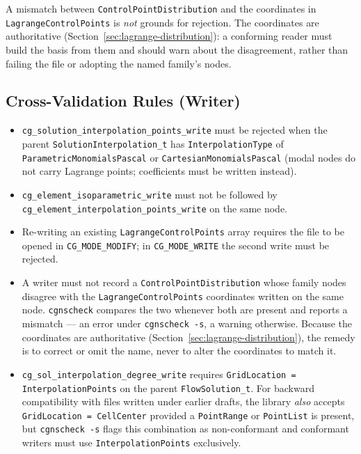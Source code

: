 \documentclass[11pt,letterpaper]{article}
\begin{document}
\noindent A mismatch between
\texttt{Control\-Point\-Distribution}\allowbreak{} and the coordinates in
\texttt{Lagrange\-Control\-Points} is \emph{not} grounds for rejection.  The coordinates are
authoritative (Section~\ref{sec:lagrange-distribution}): a conforming reader must build the
basis from them and should warn about the disagreement, rather than failing the file or
adopting the named family's nodes.

\subsection{Cross-Validation Rules (Writer)}

{\sloppy
\begin{itemize}
  \item \texttt{cg\_solution\_interpolation\_points\_write} must be rejected when the
    parent \texttt{SolutionInterpolation\_t} has \texttt{InterpolationType} of
    \texttt{ParametricMonomialsPascal} or \texttt{CartesianMonomialsPascal} (modal nodes do not
    carry Lagrange points; coefficients must be written instead).
  \item \texttt{cg\_element\_isoparametric\_write} must not be followed by
    \texttt{cg\_element\_interpolation\_points\_write} on the same node.
  \item Re-writing an existing \texttt{LagrangeControlPoints}
    array requires the file to be opened in \texttt{CG\_MODE\_MODIFY}; in
    \texttt{CG\_MODE\_WRITE} the second write must be rejected.
  \item A writer must not record a \texttt{ControlPointDistribution} whose family
    nodes disagree with the \texttt{LagrangeControlPoints} coordinates written on the same
    node.  \texttt{cgnscheck} compares the two whenever both are present and reports a
    mismatch --- an error under \texttt{cgnscheck -s}, a warning otherwise.  Because the
    coordinates are authoritative (Section~\ref{sec:lagrange-distribution}), the remedy is to
    correct or omit the name, never to alter the coordinates to match it.
  \item \texttt{cg\_sol\_interpolation\_degree\_write} requires
    \texttt{GridLocation = InterpolationPoints} on the parent \texttt{FlowSolution\_t}.
    For backward compatibility with files written under earlier drafts, the library
    \emph{also} accepts \texttt{GridLocation = CellCenter} provided a
    \texttt{PointRange} or \texttt{PointList} is present, but \texttt{cgnscheck -s}
    flags this combination as non-conformant and conformant writers must use
    \texttt{InterpolationPoints} exclusively.
\end{itemize}
\par}
\end{document}
